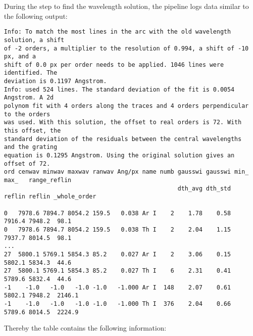 \documentclass[10pt,a4paper]{article}
\begin{document}
During the step to find the wavelength solution, the pipeline logs data similar to the following output:
\begin{lstlisting}[style=base, basicstyle=\tiny]
Info: To match the most lines in the arc with the old wavelength solution, a shift
of -2 orders, a multiplier to the resolution of 0.994, a shift of -10 px, and a
shift of 0.0 px per order needs to be applied. 1046 lines were identified. The
deviation is 0.1197 Angstrom.
Info: used 524 lines. The standard deviation of the fit is 0.0054 Angstrom. A 2d
polynom fit with 4 orders along the traces and 4 orders perpendicular to the orders
was used. With this solution, the offset to real orders is 72. With this offset, the
standard deviation of the residuals between the central wavelengths and the grating
equation is 0.1295 Angstrom. Using the original solution gives an offset of 72.
ord cenwav minwav maxwav ranwav Ang/px name numb gausswi gausswi min_   max_   range_reflin
                                                 dth_avg dth_std reflin reflin _whole_order

0   7978.6 7894.7 8054.2 159.5   0.038 Ar I    2    1.78    0.58 7916.4 7948.2  98.1
0   7978.6 7894.7 8054.2 159.5   0.038 Th I    2    2.04    1.15 7937.7 8014.5  98.1
...
27  5800.1 5769.1 5854.3 85.2    0.027 Ar I    2    3.06    0.15 5802.1 5834.3  44.6
27  5800.1 5769.1 5854.3 85.2    0.027 Th I    6    2.31    0.41 5789.6 5832.4  44.6
-1    -1.0   -1.0   -1.0 -1.0   -1.000 Ar I  148    2.07    0.61 5802.1 7948.2  2146.1
-1    -1.0   -1.0   -1.0 -1.0   -1.000 Th I  376    2.04    0.66 5789.6 8014.5  2224.9
\end{lstlisting} 
Thereby the table contains the following information:
\end{document}
